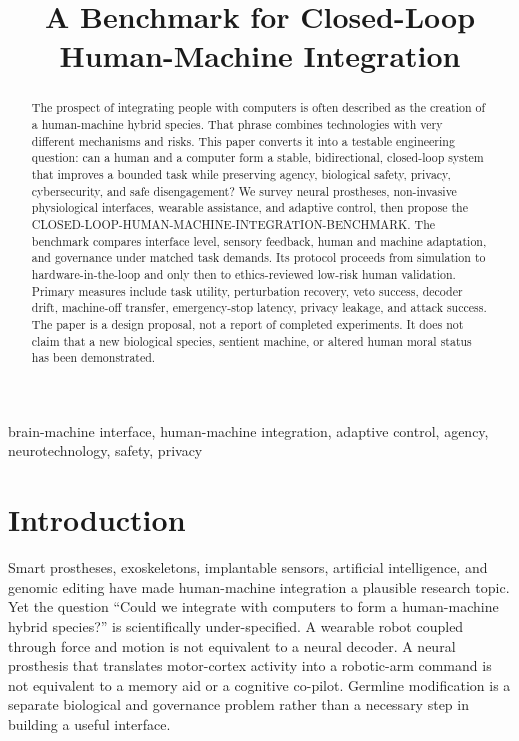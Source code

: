 \documentclass[conference]{IEEEtran}
\begin{document}
\title{A Benchmark for Closed-Loop Human-Machine Integration}

\author{
}

\maketitle

\begin{abstract}
The prospect of integrating people with computers is often described as the creation of a human-machine hybrid species. That phrase combines technologies with very different mechanisms and risks. This paper converts it into a testable engineering question: can a human and a computer form a stable, bidirectional, closed-loop system that improves a bounded task while preserving agency, biological safety, privacy, cybersecurity, and safe disengagement? We survey neural prostheses, non-invasive physiological interfaces, wearable assistance, and adaptive control, then propose the CLOSED-LOOP-HUMAN-MACHINE-INTEGRATION-BENCHMARK. The benchmark compares interface level, sensory feedback, human and machine adaptation, and governance under matched task demands. Its protocol proceeds from simulation to hardware-in-the-loop and only then to ethics-reviewed low-risk human validation. Primary measures include task utility, perturbation recovery, veto success, decoder drift, machine-off transfer, emergency-stop latency, privacy leakage, and attack success. The paper is a design proposal, not a report of completed experiments. It does not claim that a new biological species, sentient machine, or altered human moral status has been demonstrated.
\end{abstract}

\begin{IEEEkeywords}
brain-machine interface, human-machine integration, adaptive control, agency, neurotechnology, safety, privacy
\end{IEEEkeywords}

\section{Introduction}

Smart prostheses, exoskeletons, implantable sensors, artificial intelligence, and genomic editing have made human-machine integration a plausible research topic. Yet the question ``Could we integrate with computers to form a human-machine hybrid species?'' is scientifically under-specified. A wearable robot coupled through force and motion is not equivalent to a neural decoder. A neural prosthesis that translates motor-cortex activity into a robotic-arm command is not equivalent to a memory aid or a cognitive co-pilot. Germline modification is a separate biological and governance problem rather than a necessary step in building a useful interface.
\end{document}
